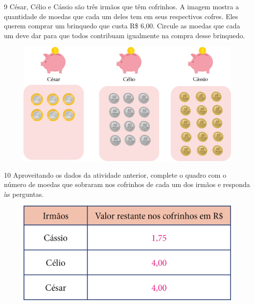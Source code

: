 \begin{mdframed}[linewidth=2pt,linecolor=salmao,roundcorner=10pt]

\vspace*{6cm}
\end{mdframed}
\pagebreak

\num{9} César, Célio e Cássio são três irmãos que têm cofrinhos. A
imagem mostra a quantidade de moedas que cada um deles tem em
seus respectivos cofres. Eles querem comprar um brinquedo que custa R\$ 6,00.
Circule as moedas que cada um deve dar para que todos contribuam
igualmente na compra desse brinquedo.

\begin{figure}[htpb!]
\includegraphics[width=\textwidth]{./media/image76.png}
\end{figure}


\num{10} Aproveitando os dados da atividade anterior, complete o quadro com o número de moedas que sobraram nos cofrinhos de cada um dos irmãos e responda às perguntas.

\begin{figure}[htpb!]
\centering
\includegraphics[width=.6\textwidth]{./media/image77.png}
\end{figure}

